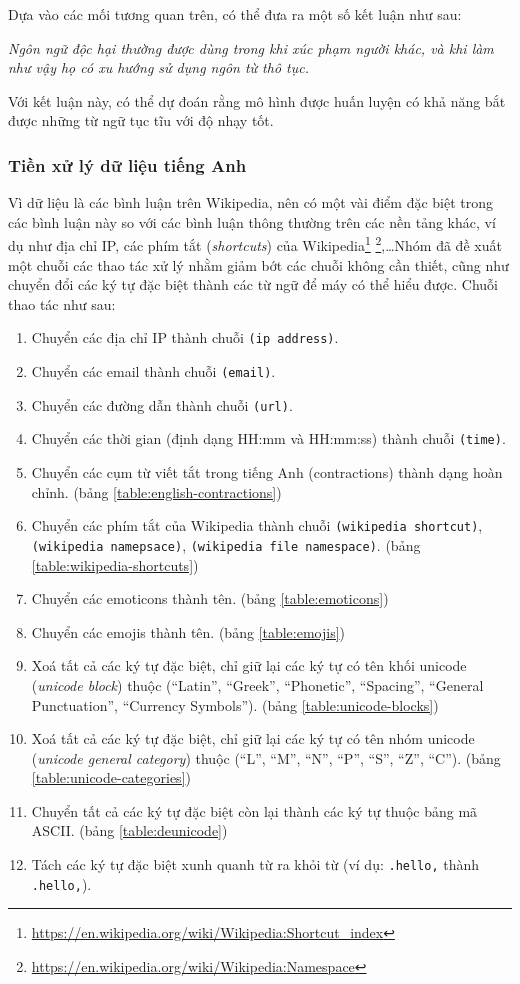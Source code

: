 Dựa vào các mối tương quan trên, có thể đưa ra một số kết luận như sau:

\textit{Ngôn ngữ độc hại thường được dùng trong khi xúc phạm người khác, và khi làm như vậy họ có xu hướng sử dụng ngôn từ thô tục.}

Với kết luận này, có thể dự đoán rằng mô hình được huấn luyện có khả năng bắt được những từ ngữ tục tĩu với độ nhạy tốt.

\subsubsection{Tiền xử lý dữ liệu tiếng Anh}\label{english-preprocess}
Vì dữ liệu là các bình luận trên Wikipedia, nên có một vài điểm đặc biệt trong các bình luận này so với các bình luận thông thường trên các nền tảng khác, ví dụ như địa chỉ IP, các phím tắt (\textit{shortcuts}) của Wikipedia\footnote{\url{https://en.wikipedia.org/wiki/Wikipedia:Shortcut_index}} \footnote{\url{https://en.wikipedia.org/wiki/Wikipedia:Namespace}},\dots Nhóm đã đề xuất một chuỗi các thao tác xử lý nhằm giảm bớt các chuỗi không cần thiết, cũng như chuyển đổi các ký tự đặc biệt thành các từ ngữ để máy có thể hiểu được. Chuỗi thao tác như sau:
\begin{enumerate}
    \item Chuyển các địa chỉ IP thành chuỗi \texttt{(ip address)}.
    \item Chuyển các email thành chuỗi \texttt{(email)}.
    \item Chuyển các đường dẫn thành chuỗi \texttt{(url)}.
    \item Chuyển các thời gian (định dạng HH:mm và HH:mm:ss) thành chuỗi \texttt{(time)}.
    \item Chuyển các cụm từ viết tắt trong tiếng Anh (contractions) thành dạng hoàn chỉnh. (bảng \ref{table:english-contractions})
    \item Chuyển các phím tắt của Wikipedia thành chuỗi \texttt{(wikipedia shortcut)}, \\\texttt{(wikipedia namepsace)}, \texttt{(wikipedia file namespace)}. (bảng \ref{table:wikipedia-shortcuts})
    \item Chuyển các emoticons thành tên. (bảng \ref{table:emoticons})
    \item Chuyển các emojis thành tên. (bảng \ref{table:emojis})
    \item Xoá tất cả các ký tự đặc biệt, chỉ giữ lại các ký tự có tên khối unicode (\textit{unicode block}) thuộc (``Latin'', ``Greek'', ``Phonetic'', ``Spacing'', ``General Punctuation'', ``Currency Symbols''). (bảng \ref{table:unicode-blocks})
    \item Xoá tất cả các ký tự đặc biệt, chỉ giữ lại các ký tự có tên nhóm unicode (\textit{unicode general category}) thuộc (``L'', ``M'', ``N'', ``P'', ``S'', ``Z'', ``C''). (bảng \ref{table:unicode-categories})
    \item Chuyển tất cả các ký tự đặc biệt còn lại thành các ký tự thuộc bảng mã ASCII. (bảng \ref{table:deunicode})
    \item Tách các ký tự đặc biệt xunh quanh từ ra khỏi từ (ví dụ: {\tt .hello,} thành {\tt .\textvisiblespace hello\textvisiblespace,}).
\end{enumerate}

